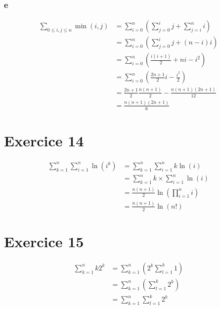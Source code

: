 \documentclass{report}
\begin{document}
\subsubsection*{e}

\begin{equation*}
	\begin{split}
		\sum_{0 \le i, j \le n} \min(i,j)
		    &= \sum_{i=0}^{n} \left( \sum_{j=0}^{i} j + \sum_{j=i}^{n}i\right) \\
			&= \sum_{i=0}^{n} \left( \sum_{j=0}^{i} j +(n-i)i\right)  \\
			&=\sum_{i=0}^{n} \left( \frac{i(i+1)}{2} + ni-i^2\right) \\
			&=\sum_{i=0}^{n} \left( \frac{2n+1}{2}i -\frac{i^2}{2}\right) \\
			&= \frac{2n+1}{2} \frac{n(n+1)}{2} - \frac{n(n+1)(2n+1)}{12} \\
			&= \frac{n(n+1)(2n+1)}{6}
	\end{split}
\end{equation*}

\section*{Exercice 14}

\begin{equation*}
	\begin{split}
		\sum_{k=1}^{n} \sum_{i=1}^{n}\ln(i^k)
			&=  \sum_{k=1}^{n} \sum_{i=1}^{n} k\ln(i)\\
			&=  \sum_{k=1}^{n} k \times \sum_{i=1}^{n} \ln(i)\\
			&= \frac{n(n+1)}{2} \ln\left( \prod_{i=1}^{n}i\right) \\
			&= \frac{n(n+1)}{2} \ln\left( n! \right)
	\end{split}
\end{equation*}


\section*{Exercice 15}

\begin{equation*}
	\begin{split}
		\sum_{k=1}^{n} k2^k
		&=  \sum_{k=1}^{n}\left(2^k \sum_{l=1}^{k}1\right)\\
		&=  \sum_{k=1}^{n}\left(\sum_{l=1}^{k} 2^k\right)\\
		&=  \sum_{k=1}^{n}\sum_{l=1}^{k} 2^k\\
	\end{split}
\end{equation*}
\end{document}
